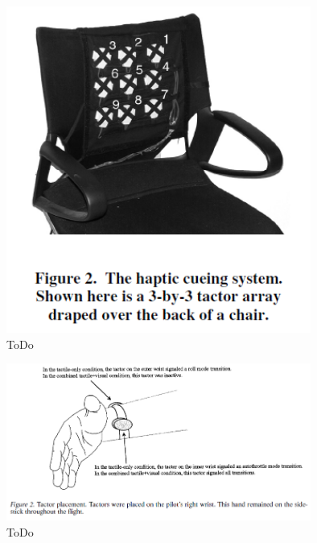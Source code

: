 \documentclass{llncs}					%
\begin{document}
\begin{figure}[htbp]
	\begin{center}
		\includegraphics[width = 10cm]{Grafiken/21-Haptic-System-3x3.png}
		\caption{ToDo}
		\label{21-Haptic-System-3x3}
	\end{center}
\end{figure}

\begin{figure}[htbp]
	\begin{center}
		\includegraphics[width = 10cm]{Grafiken/25-Tactor-Placement-Good-Vibration.png}
		\caption{ToDo}
		\label{25-Tactor-Placement-Good-Vibration}
	\end{center}
\end{figure}
\end{document}
